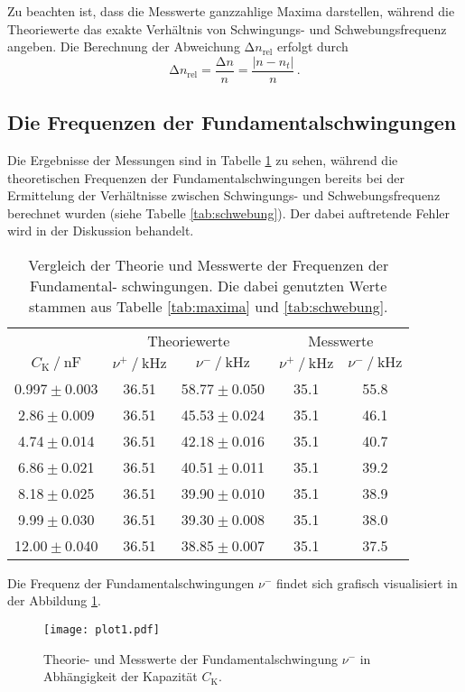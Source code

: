Zu beachten ist, dass die Messwerte
ganzzahlige Maxima darstellen, während die Theoriewerte das exakte Verhältnis von
Schwingungs- und Schwebungsfrequenz angeben. Die Berechnung der Abweichung $\increment n_{\text{rel}}$ erfolgt durch
\begin{equation}
    \increment n_{\text{rel}}=\frac{\increment n}{n}=\frac{\left|n-n_{t}\right|}{n} \, .
\end{equation}


\subsection{Die Frequenzen der Fundamentalschwingungen}

Die Ergebnisse der Messungen sind in Tabelle \ref{tab:vergleich} zu sehen, während die
theoretischen Frequenzen der Fundamentalschwingungen bereits bei der
Ermittelung der Verhältnisse zwischen Schwingungs- und Schwebungsfrequenz berechnet
wurden (siehe Tabelle \ref{tab:schwebung}). Der dabei auftretende Fehler wird in der Diskussion behandelt.
\begin{table}
    \centering
    \caption{   Vergleich der Theorie und Messwerte der Frequenzen der Fundamental-
                schwingungen. Die dabei genutzten Werte stammen aus Tabelle
                \ref{tab:maxima} und \ref{tab:schwebung}.}
    \label{tab:vergleich}
    \begin{tabular}{c c c c c}
    \toprule
    & \multicolumn{2}{c}{Theoriewerte} & \multicolumn{2}{c}{Messwerte} \\
    \cmidrule(lr){2-3}\cmidrule(lr){4-5}
    {${C_\text{K}} \mathbin{/} \unit{\nano\farad}$} &
    {$\nu^+ \mathbin{/} \unit{\kilo\hertz}$} & {$\nu^- \mathbin{/} \unit{\kilo\hertz}$} &
    {$\nu^+ \mathbin{/} \unit{\kilo\hertz}$} & {$\nu^- \mathbin{/} \unit{\kilo\hertz}$} \\
    \midrule
    0.997${}\pm{}$0.003 &    36.51 & 58.77${}\pm{}$0.050 &    35.1 &   55.8 \\
     2.86${}\pm{}$0.009 &    36.51 & 45.53${}\pm{}$0.024 &    35.1 &   46.1 \\
     4.74${}\pm{}$0.014 &    36.51 & 42.18${}\pm{}$0.016 &    35.1 &   40.7 \\
     6.86${}\pm{}$0.021 &    36.51 & 40.51${}\pm{}$0.011 &    35.1 &   39.2 \\
     8.18${}\pm{}$0.025 &    36.51 & 39.90${}\pm{}$0.010 &    35.1 &   38.9 \\
     9.99${}\pm{}$0.030 &    36.51 & 39.30${}\pm{}$0.008 &    35.1 &   38.0 \\
    12.00${}\pm{}$0.040 &    36.51 & 38.85${}\pm{}$0.007 &    35.1 &   37.5 \\
    \bottomrule
    \end{tabular}
\end{table}

Die Frequenz der Fundamentalschwingungen $\nu^-$ findet sich grafisch visualisiert in der
Abbildung \ref{fig:plot1}.
\begin{figure} [H]
    \centering
    \texttt{[image: plot1.pdf]}
    \caption{Theorie- und Messwerte der Fundamentalschwingung $\nu^-$ in Abhängigkeit
    der Kapazität ${C_\text{K}}$.}
    \label{fig:plot1}
\end{figure}
